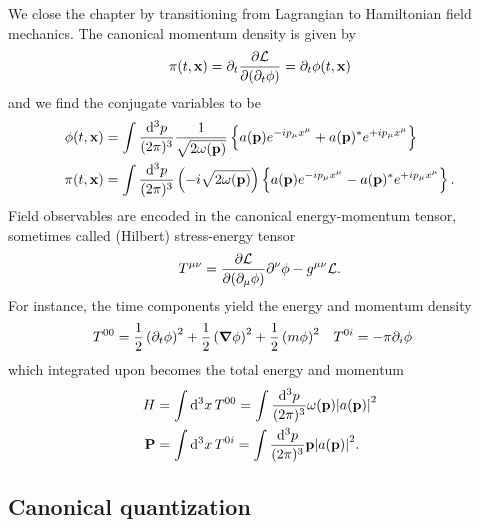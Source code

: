 We close the chapter by transitioning from Lagrangian to Hamiltonian field mechanics.
The canonical momentum density is given by
\begin{equation}
	\pi(t,\vb{x})
	=
	\partial_t\pdv{\mathcal{L}}{(\partial_t\phi)}
	=
	\partial_t\phi(t,\vb{x})
	\label{eq:canonical_momentum}
\end{equation}
and we find the conjugate variables to be
\begin{align}
	\phi(t,\vb{x})
	&=
	\int\frac{\dd[3]{p}}{(2\pi)^3}
	\frac{1}{\sqrt{2\omega(\vb{p})}}
	\left\{
		a(\vb{p})
		e^{-ip_\mu x^\mu}
		+
		a(\vb{p})^*
		e^{+ip_\mu x^\mu}
	\right\}
	\label{eq:kg_pos}
	\\
	\pi(t,\vb{x})
	&=
	\int\frac{\dd[3]{p}}{(2\pi)^3}
	\left(-i\sqrt{2\omega(\vb{p})}\right)
	\left\{
		a(\vb{p})
		e^{-ip_\mu x^\mu}
		-
		a(\vb{p})^*
		e^{+ip_\mu x^\mu}
	\right\}
	\label{eq:kg_mom}.
\end{align}
Field observables are encoded in the canonical energy-momentum tensor, sometimes called (Hilbert) stress-energy tensor
\begin{equation}
	T^{\mu\nu}
	=
	\pdv{\mathcal{L}}{(\partial_\mu\phi)}\partial^\nu\phi
	-
	g^{\mu\nu}\mathcal{L}
	\label{eq:energy_momentum_tensor}.
\end{equation}
For instance, the time components yield the energy and momentum density
\begin{align}
	T^{00}
	=
	\frac{1}{2}
	\left(\partial_t\phi\right)^2
	+
	\frac{1}{2}
	\left(\grad\phi\right)^2
	+
	\frac{1}{2}
	\left(m\phi\right)^2
	&&
	T^{0i}
	&=
	-\pi\partial_i\phi
\end{align}
which integrated upon becomes the total energy and momentum
\begin{align}
	H
	&=
	\int\dd[3]{x}T^{00}
	=
	\int\frac{\dd[3]{p}}{(2\pi)^3}
	\omega(\vb{p})\abs{a(\vb{p})}^2
	\label{eq:kg_total_energy}
	\\
	\vb{P}
	&=
	\int\dd[3]{x}T^{0i}
	=
	\int\frac{\dd[3]{p}}{(2\pi)^3}
	\vb{p}\abs{a(\vb{p})}^2
	\label{eq:kg_total_momentum}
	.
\end{align}

\subsection{Canonical quantization}

